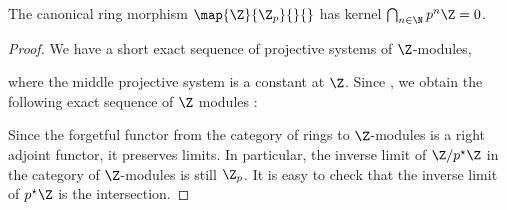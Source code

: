 \begin{prop}
  
  The canonical ring morphism $\map{\Z}{\Z_p}{}{}$ has kernel 
  $\bigcap_{n \in \N} p^n\Z = 0$.
\end{prop}
\begin{proof}
  
  We have a short exact sequence of projective systems of $\Z$-modules, 
  \begin{figure}[H]
    \centering
  \end{figure}
  where the middle projective system is a constant at $\Z$. 
  Since , we obtain the following 
  exact sequence of $\Z$ modules : 
  \begin{figure}[H]
    \centering
  \end{figure} 
  Since the forgetful functor from the category of rings to 
  $\Z$-modules is a right adjoint functor, it preserves limits.
  In particular, 
  the inverse limit of $\Z/p^\star\Z$ in the category of $\Z$-modules is 
  still $\Z_p$.
  It is easy to check that the inverse limit of $p^\star\Z$ is the intersection.
\end{proof}

